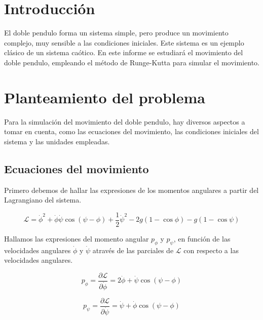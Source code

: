 \documentclass[11pt, twoside]{article} %
\begin{document}
\newpage

\setcounter{page}{0}
\tableofcontents
\newpage

\pagestyle{main}

\section{Introducción}

El doble pendulo forma un sistema simple, pero produce un movimiento complejo,
muy sensible a las condiciones iniciales. Este sistema es un ejemplo clásico
de un sistema caótico. En este informe se estudiará el movimiento del doble
pendulo, empleando el método de Runge-Kutta para simular el movimiento.

\section{Planteamiento del problema}

Para la simulación del movimiento del doble pendulo, hay diversos aspectos 
a tomar en cuenta, como las ecuaciones del movimiento, las condiciones iniciales
del sistema y las unidades empleadas.

\subsection{Ecuaciones del movimiento}
Primero debemos de hallar las expresiones de los momentos angulares
a partir del Lagrangiano del sistema. 

\begin{equation}
    \mathcal{L} = \dot{\phi}^2 + \dot{\phi}\dot{\psi} \cos(\psi - \phi) +
     \frac{1}{2}\dot{\psi}^2 - 2g(1-\cos\phi) - g(1-\cos\psi) 
\end{equation}

Hallamos las expresiones del momento angular $p_\phi$ y $p_\psi$, en función
de las velocidades angulares $\dot{\phi}$ y $\dot{\psi}$ através de las 
parciales de $\mathcal{L}$ con respecto a las velocidades angulares.

\begin{equation}
    p_\phi = \frac{\partial \mathcal{L}}{\partial \dot{\phi}} = 2\dot{\phi} + \dot{\psi}\cos(\psi - \phi)
\end{equation}

\begin{equation}
    p_\psi = \frac{\partial \mathcal{L}}{\partial \dot{\psi}} = \dot{\psi} + \dot{\phi}\cos(\psi - \phi)
\end{equation}
\end{document}
